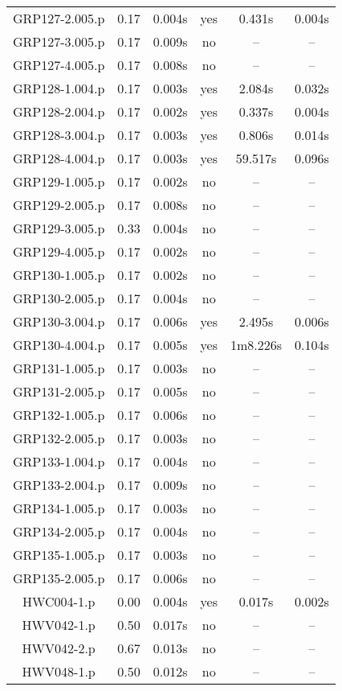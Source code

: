 \begin{longtable}{||c | c | c | c | c | c||}
GRP127-2.005.p & 0.17 & 0.004s & yes & 0.431s & 0.004s \\
GRP127-3.005.p & 0.17 & 0.009s & no & -- & -- \\
GRP127-4.005.p & 0.17 & 0.008s & no & -- & -- \\
GRP128-1.004.p & 0.17 & 0.003s & yes & 2.084s & 0.032s \\
GRP128-2.004.p & 0.17 & 0.002s & yes & 0.337s & 0.004s \\
GRP128-3.004.p & 0.17 & 0.003s & yes & 0.806s & 0.014s \\
GRP128-4.004.p & 0.17 & 0.003s & yes & 59.517s & 0.096s \\
GRP129-1.005.p & 0.17 & 0.002s & no & -- & -- \\
GRP129-2.005.p & 0.17 & 0.008s & no & -- & -- \\
GRP129-3.005.p & 0.33 & 0.004s & no & -- & -- \\
GRP129-4.005.p & 0.17 & 0.002s & no & -- & -- \\
GRP130-1.005.p & 0.17 & 0.002s & no & -- & -- \\
GRP130-2.005.p & 0.17 & 0.004s & no & -- & -- \\
GRP130-3.004.p & 0.17 & 0.006s & yes & 2.495s & 0.006s \\
GRP130-4.004.p & 0.17 & 0.005s & yes & 1m8.226s & 0.104s \\
GRP131-1.005.p & 0.17 & 0.003s & no & -- & -- \\
GRP131-2.005.p & 0.17 & 0.005s & no & -- & -- \\
GRP132-1.005.p & 0.17 & 0.006s & no & -- & -- \\
GRP132-2.005.p & 0.17 & 0.003s & no & -- & -- \\
GRP133-1.004.p & 0.17 & 0.004s & no & -- & -- \\
GRP133-2.004.p & 0.17 & 0.009s & no & -- & -- \\
GRP134-1.005.p & 0.17 & 0.003s & no & -- & -- \\
GRP134-2.005.p & 0.17 & 0.004s & no & -- & -- \\
GRP135-1.005.p & 0.17 & 0.003s & no & -- & -- \\
GRP135-2.005.p & 0.17 & 0.006s & no & -- & -- \\
HWC004-1.p & 0.00 & 0.004s & yes & 0.017s & 0.002s \\
HWV042-1.p & 0.50 & 0.017s & no & -- & -- \\
HWV042-2.p & 0.67 & 0.013s & no & -- & -- \\
HWV048-1.p & 0.50 & 0.012s & no & -- & -- \\

\end{longtable}
